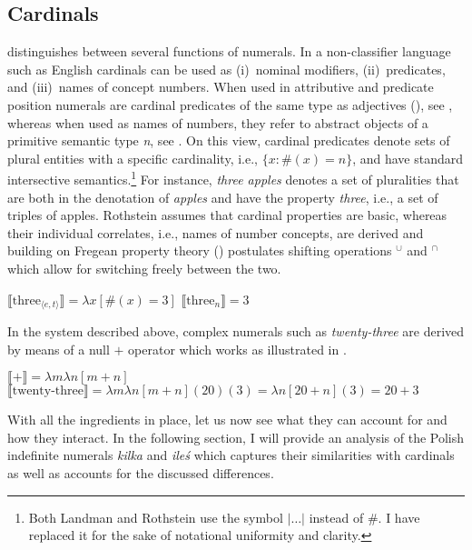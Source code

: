 \documentclass[output=paper,
]{langscibook}
\begin{document}
	\subsection{Cardinals}\label{sec:cardinals}
	
	\cite{rothstein2013fregean,rothstein2017semantics} distinguishes between several functions of numerals. In a non-classifier language such as English cardinals can be used as (i)~nominal modifiers, (ii)~predicates, and (iii)~names of concept numbers. When used in attributive and predicate position numerals are cardinal predicates of the same type as adjectives (\citealt{landman2003predicate}), see , whereas when used as names of numbers, they refer to abstract objects of a primitive semantic type \textit{n}, see . On this view, cardinal predicates denote sets of plural entities with a specific cardinality, i.e., $\{ x: \#(x) = n\}$, and have standard intersective semantics.\footnote{Both Landman and Rothstein use the symbol $|\dots|$ instead of $\#$. I have replaced it for the sake of notational uniformity and clarity.} For instance, \textit{three apples} denotes a set of pluralities that are both in the denotation of \textit{apples} and have the property \textit{three}, i.e., a set of triples of apples. Rothstein assumes that cardinal properties are basic, whereas their individual correlates, i.e., names of number concepts, are derived and building on Fregean property theory (\citealt{chierchia1985formal}) postulates shifting operations $^\cup$ and $^\cap$ which allow for switching freely between the two.
	
	\ea \ea $\llbracket\text{three}_{\langle e,t\rangle}\rrbracket=\lambda x[\#(x) = 3]$\label{ex:cardinals-predicates}
	\ex $\llbracket\text{three}_n\rrbracket=3$\label{ex:cardinals-names}    
	\z
    \z

\noindent In the system described above, complex numerals such as \textit{twenty-three} are derived by means of a null $+$ operator which works as illustrated in .

	\ea\label{ex:plus} \ea $\llbracket+\rrbracket=\lambda m\lambda n[m+n]$
	\ex $\llbracket\text{twenty-three}\rrbracket=\lambda m\lambda n[m+n](20)(3)=\lambda n[20+n](3)=20+3$  
	\z
    \z

	\noindent With all the ingredients in place, let us now see what they can account for and how they interact. In the following section, I will provide an analysis of the Polish indefinite numerals \textit{kilka} and \textit{ileś} which captures their similarities with cardinals as well as accounts for the discussed differences. 
	
\end{document}
